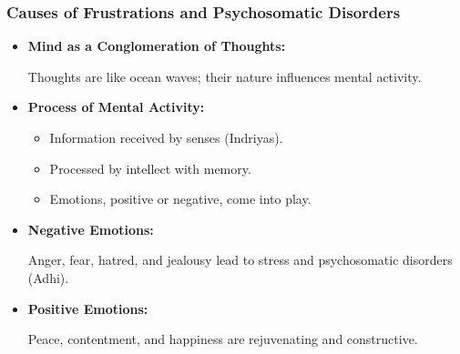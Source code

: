 \begin{frame}[fragile]\frametitle{Causes of Frustrations and Psychosomatic Disorders}

      \begin{itemize}
        \item \textbf{Mind as a Conglomeration of Thoughts:}
        
        Thoughts are like ocean waves; their nature influences mental activity.
        
        \item \textbf{Process of Mental Activity:}
        \begin{itemize}
            \item Information received by senses (Indriyas).
            \item Processed by intellect with memory.
            \item Emotions, positive or negative, come into play.
        \end{itemize}
        \item \textbf{Negative Emotions:}
        
        Anger, fear, hatred, and jealousy lead to stress and psychosomatic disorders (Adhi).
        
        \item \textbf{Positive Emotions:}
        
        Peace, contentment, and happiness are rejuvenating and constructive.
        
      \end{itemize}

\end{frame}

